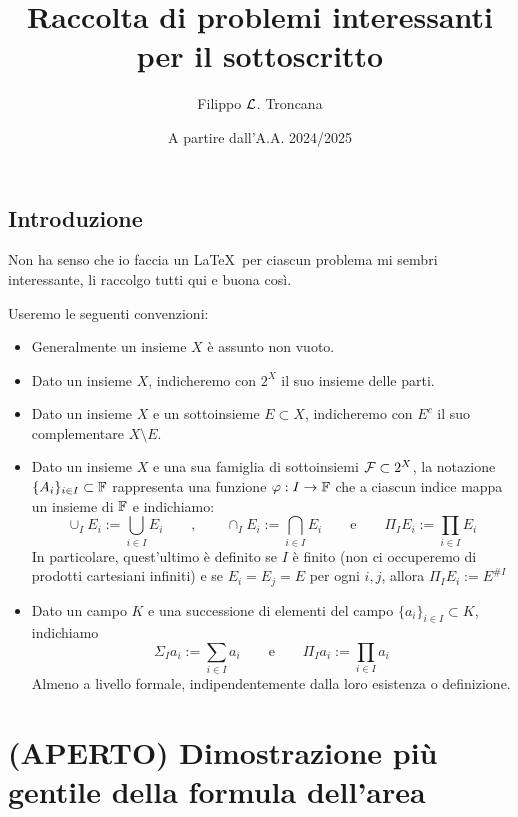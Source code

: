 \documentclass[openany]{book}
\title{Raccolta di problemi interessanti per il sottoscritto}
\author{Filippo $\mathcal{L}$. Troncana}
\date{A partire dall'A.A. 2024/2025}
\begin{document}
\maketitle

\tableofcontents

\section*{Introduzione}

Non ha senso che io faccia un \LaTeX\ per ciascun problema mi sembri interessante, li raccolgo tutti qui e buona così.

\begin{notation}{}{}
    Useremo le seguenti convenzioni:\begin{itemize}
        \item Generalmente un insieme $X$ è assunto non vuoto.
        \item Dato un insieme $X$, indicheremo con $2^X$ il suo insieme delle parti.
        \item Dato un insieme $X$ e un sottoinsieme $E\subset X$, indicheremo con $E^c$ il suo complementare $X\setminus E$.
        \item Dato un insieme $X$ e una sua famiglia di sottoinsiemi $\mathcal{F} \subset 2^X$, la notazione $\{A_i\}_{i \in I} \subset \mathbb{F}$ rappresenta una funzione $\varphi: I \to \mathbb{F}$ che a ciascun indice mappa un insieme di $\mathbb{F}$ e indichiamo:
        \[\cup_I E_i := \bigcup_{i \in I} E_i \qquad, \qquad \cap_I E_i := \bigcap_{i \in I} E_i \qquad \text{e}\qquad \Pi_I E_i := \prod_{i \in I} E_i \]
        In particolare, quest'ultimo è definito se $I$ è finito (non ci occuperemo di prodotti cartesiani infiniti) e se $E_i = E_j= E $ per ogni $i,j$, allora $\Pi_I E_i := E^{\# I}$
        \item Dato un campo $K$ e una successione di elementi del campo $\{a_i\}_{i \in I}\subset K$, indichiamo
        \[\Sigma_I a_i := \sum_{i \in I} a_i \qquad\text{e} \qquad \Pi_I a_i := \prod_{i \in I} a_i \]
        Almeno a livello formale, indipendentemente dalla loro esistenza o definizione.
    \end{itemize}
\end{notation}

\chapter{(APERTO) Dimostrazione più gentile della formula dell'area}

\renewcommand\A{\mc{A}}
\end{document}
